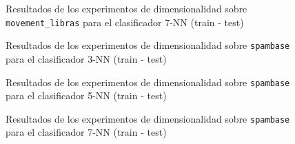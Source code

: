 \begin{figure}[h]
\caption{Resultados de los experimentos de dimensionalidad sobre \texttt{movement\_libras} para el clasificador 7-NN (train - test)} \label{results:dim:libras:7nn}
\end{figure}

\begin{figure}[h]
\caption{Resultados de los experimentos de dimensionalidad sobre \texttt{spambase} para el clasificador 3-NN (train - test)} \label{results:dim:spambase:3nn}
\end{figure}

\begin{figure}[h]
\caption{Resultados de los experimentos de dimensionalidad sobre \texttt{spambase} para el clasificador 5-NN (train - test)} \label{results:dim:spambase:5nn}
\end{figure}

\begin{figure}[h]
\caption{Resultados de los experimentos de dimensionalidad sobre \texttt{spambase} para el clasificador 7-NN (train - test)} \label{results:dim:spambase:7nn}
\end{figure}


